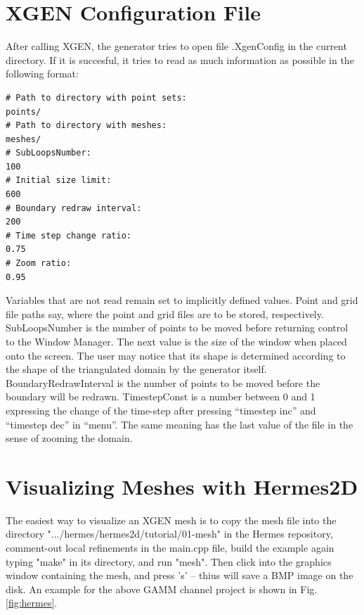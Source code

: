 \documentclass[12pt]{article}
\begin{document}
  \section{XGEN Configuration File}
   
  After calling XGEN, the generator tries to open file
  .XgenConfig in the current directory. If it is succesful,
  it tries to read as much information as possible in the
  following format:

  \begin{verbatim} 
# Path to directory with point sets:
points/
# Path to directory with meshes:
meshes/
# SubLoopsNumber:
100
# Initial size limit:
600
# Boundary redraw interval:
200
# Time step change ratio:
0.75
# Zoom ratio:
0.95
  \end{verbatim}
  Variables that are not read remain set to implicitly defined
  values. Point and grid file paths say, where the point and grid 
  files are to be stored, respectively. SubLoopsNumber is the number of
  points to be moved before returning control to the Window Manager.
  The next value is the size of the window when placed onto the screen.
  The user may notice that its shape is determined according to the shape
  of the triangulated domain by the generator itself. BoundaryRedrawInterval
  is the number of points to be moved before the boundary will be
  redrawn. TimestepConst is a number between 0 and 1 expressing the change of
  the time-step after pressing ``timestep inc'' and ``timestep dec'' in ``menu''.
  The same meaning has the last value of the file in the sense of
  zooming the domain.

  \section{Visualizing Meshes with Hermes2D}

  The easiest way to visualize an XGEN mesh is to copy the mesh file into 
  the directory ".../hermes/hermes2d/tutorial/01-mesh" in the Hermes repository, 
  comment-out local refinements
  in the main.cpp file, build the example again typing "make" in its directory, and 
  run "mesh". Then click into the graphics window containing the mesh, and press 's'
  -- thius will save a BMP image on the disk. An example for the above GAMM channel
  project is shown in Fig. \ref{fig:hermes}.
\end{document}

